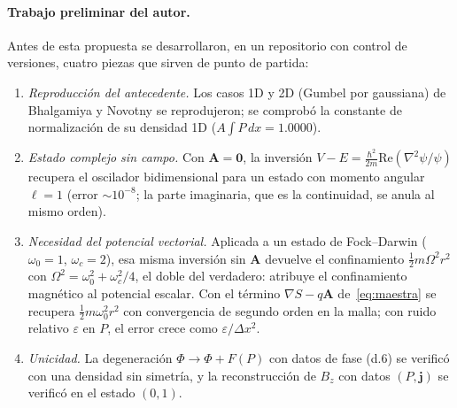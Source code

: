 \documentclass[12pt,letterpaper]{article}
\newcommand{\jv}{\mathbf{j}}
\newcommand{\Av}{\mathbf{A}}
\newcommand{\grad}{\nabla}
\begin{document}
\paragraph{Trabajo preliminar del autor.} Antes de esta propuesta se desarrollaron, en un repositorio con control de
versiones, cuatro piezas que sirven de punto de partida:
\begin{enumerate}[leftmargin=1.8em]
  \item \emph{Reproducción del antecedente.} Los casos 1D y 2D (Gumbel por gaussiana) de Bhalgamiya y Novotny se
        reprodujeron; se comprobó la constante de normalización de su densidad 1D ($A\int P\,dx=1.0000$).
  \item \emph{Estado complejo sin campo.} Con $\Av=\mathbf 0$, la inversión $V-E=\frac{\hbar^2}{2m}\mathrm{Re}(\grad^2\psi/\psi)$
        recupera el oscilador bidimensional para un estado con momento angular $\ell=1$ (error $\sim10^{-8}$; la parte
        imaginaria, que es la continuidad, se anula al mismo orden).
  \item \emph{Necesidad del potencial vectorial.} Aplicada a un estado de Fock--Darwin ($\omega_0=1$, $\omega_c=2$), esa
        misma inversión sin $\Av$ devuelve el confinamiento $\frac12m\Omega^2r^2$ con $\Omega^2=\omega_0^2+\omega_c^2/4$, el
        doble del verdadero: atribuye el confinamiento magnético al potencial escalar. Con el término $\grad S-q\Av$
        de~\eqref{eq:maestra} se recupera $\frac12m\omega_0^2r^2$ con convergencia de segundo orden en la malla; con ruido
        relativo $\varepsilon$ en $P$, el error crece como $\varepsilon/\Delta x^2$.
  \item \emph{Unicidad.} La degeneración $\Phi\to\Phi+F(P)$ con datos de fase (d.6) se verificó con una densidad sin
        simetría, y la reconstrucción de $B_z$ con datos $(P,\jv)$ se verificó en el estado $(0,1)$.
\end{enumerate}

\end{document}
